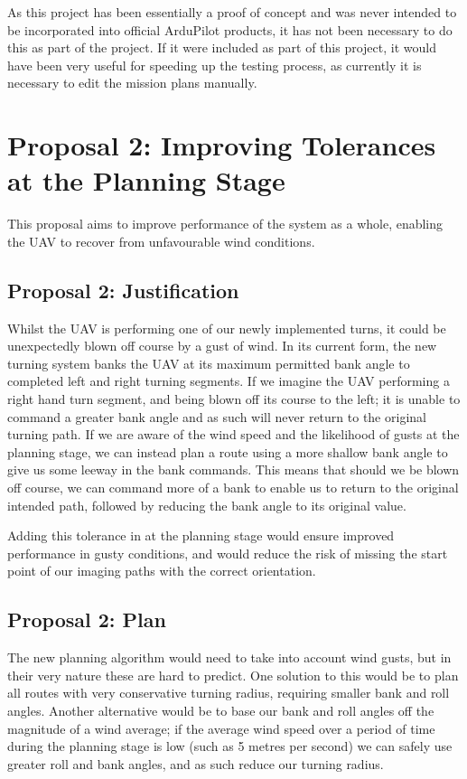 As this project has been essentially a proof of concept and was never intended to be incorporated into official ArduPilot products, it has not been necessary to do this as part of the project. If it were included as part of this project, it would have been very useful for speeding up the testing process, as currently it is necessary to edit the mission plans manually. 

\section{Proposal 2: Improving Tolerances at the Planning Stage} 
\label{future:tolerance}
This proposal aims to improve performance of the system as a whole, enabling the UAV to recover from unfavourable wind conditions.

\subsection{Proposal 2: Justification}
\label{future:tolerancereason}
Whilst the UAV is performing one of our newly implemented turns, it could be unexpectedly blown off course by a gust of wind. In its current form, the new turning system banks the UAV at its maximum permitted bank angle to completed left and right turning segments. If we imagine the UAV performing a right hand turn segment, and being blown off its course to the left; it is unable to command a greater bank angle and as such will never return to the original turning path. If we are aware of the wind speed and the likelihood of gusts at the planning stage, we can instead plan a route using a more shallow bank angle to give us some leeway in the bank commands. This means that should we be blown off course, we can command more of a bank to enable us to return to the original intended path, followed by reducing the bank angle to its original value. 

Adding this tolerance in at the planning stage would ensure improved performance in gusty conditions, and would reduce the risk of missing the start point of our imaging paths with the correct orientation.  

\subsection{Proposal 2: Plan} 
\label{future:toleranceplan}
The new planning algorithm would need to take into account wind gusts, but in their very nature these are hard to predict. One solution to this would be to plan all routes with very conservative turning radius, requiring smaller bank and roll angles. Another alternative would be to base our bank and roll angles off the magnitude of a wind average; if the average wind speed over a period of time during the planning stage is low (such as 5 metres per second) we can safely use greater roll and bank angles, and as such reduce our turning radius. 

